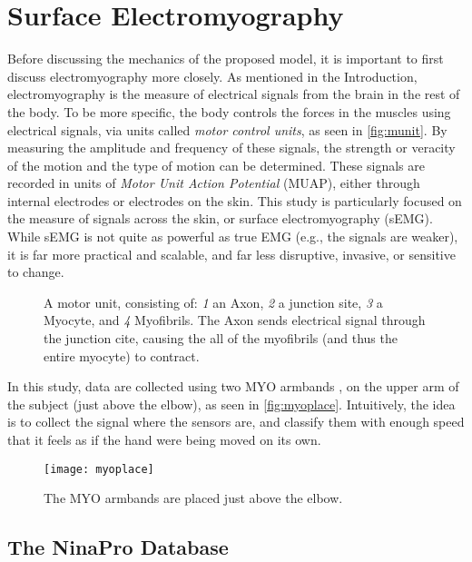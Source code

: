 \section{Surface Electromyography}

Before discussing the mechanics of the proposed model, it is important to first discuss electromyography more closely. As mentioned in the Introduction, electromyography is the measure of electrical signals from the brain in the rest of the body. To be more specific, the body controls the forces in the muscles using electrical signals, via units called \emph{motor control units}, as seen in \autoref{fig:munit}. By measuring the amplitude and frequency of these signals, the strength or veracity of the motion and the type of motion can be determined. These signals are recorded in units of \emph{Motor Unit Action Potential}  (MUAP), either through internal electrodes or electrodes on the skin. This study is particularly focused on the measure of signals across the skin, or surface electromyography (sEMG). While sEMG is not quite as powerful as true EMG (e.g., the signals are weaker), it is far more practical and scalable, and far less disruptive, invasive, or sensitive to change. 
\begin{figure}[h]
\caption{%
A motor unit, consisting of: \emph{1} an Axon, \emph{2} a junction site, \emph{3} a Myocyte, and \emph{4} Myofibrils. The Axon sends electrical signal through the junction cite, causing the all of the myofibrils (and thus the entire myocyte) to contract.
}
\label{fig:munit}
\begin{center}
\end{center}
\end{figure}
In this study, data are collected using two MYO armbands \cite{myo}, on the upper arm of the subject (just above the elbow), as seen in \autoref{fig:myoplace}. Intuitively, the idea is to collect the signal where the sensors are, and classify them with enough speed that it feels as if the hand were being moved on its own.
\begin{figure}[h]
\caption{%
The MYO armbands are placed just above the elbow.
}
\label{fig:myoplace}
\begin{center}
\texttt{[image: myoplace]}
\end{center}
\end{figure}


\subsection{The NinaPro Database}

